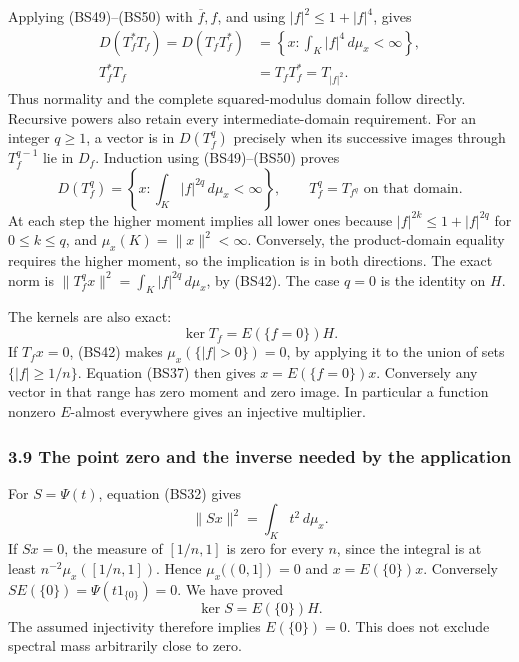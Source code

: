 \documentclass[
  11pt,
]{article}
\begin{document}
Applying (BS49)--(BS50) with \(\overline f,f\), and using
\(|f|^2\leq1+|f|^4\), gives \[
 \begin{split}
 D(T_f^*T_f)=D(T_fT_f^*)
 &=\left\{x:\int_K|f|^4\,d\mu_x<\infty\right\},\\
 T_f^*T_f&=T_fT_f^*=T_{|f|^2}.
 \end{split}
 \tag{BS53}
\] Thus normality and the complete squared-modulus domain follow
directly. Recursive powers also retain every intermediate-domain
requirement. For an integer \(q\geq1\), a vector is in \(D(T_f^q)\)
precisely when its successive images through \(T_f^{q-1}\) lie in
\(D_f\). Induction using (BS49)--(BS50) proves \[
 D(T_f^q)=\left\{x:\int_K|f|^{2q}\,d\mu_x<\infty\right\},
 \qquad T_f^q=T_{f^q}\text{ on that domain}.
 \tag{BS53a}
\] At each step the higher moment implies all lower ones because
\(|f|^{2k}\leq1+|f|^{2q}\) for \(0\leq k\leq q\), and
\(\mu_x(K)=\|x\|^2<\infty\). Conversely, the product-domain equality
requires the higher moment, so the implication is in both directions.
The exact norm is \(\|T_f^qx\|^2=\int_K|f|^{2q}\,d\mu_x\), by (BS42).
The case \(q=0\) is the identity on \(H\).

The kernels are also exact: \[
 \ker T_f=E(\{f=0\})H.
 \tag{BS54}
\] If \(T_fx=0\), (BS42) makes \(\mu_x(\{|f|>0\})=0\), by applying it to
the union of sets \(\{|f|\geq1/n\}\). Equation (BS37) then gives
\(x=E(\{f=0\})x\). Conversely any vector in that range has zero moment
and zero image. In particular a function nonzero \(E\)-almost everywhere
gives an injective multiplier.

\subsubsection{3.9 The point zero and the inverse needed by the
application}\label{the-point-zero-and-the-inverse-needed-by-the-application}

For \(S=\Psi(t)\), equation (BS32) gives \[
 \|Sx\|^2=\int_Kt^2\,d\mu_x.
 \tag{BS55}
\] If \(Sx=0\), the measure of \([1/n,1]\) is zero for every \(n\),
since the integral is at least \(n^{-2}\mu_x([1/n,1])\). Hence
\(\mu_x((0,1])=0\) and \(x=E(\{0\})x\). Conversely
\(SE(\{0\})=\Psi(t1_{\{0\}})=0\). We have proved \[
 \ker S=E(\{0\})H.
 \tag{BS56}
\] The assumed injectivity therefore implies \(E(\{0\})=0\). This does
not exclude spectral mass arbitrarily close to zero.
\end{document}
